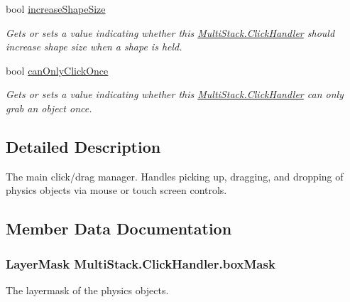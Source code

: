 \begin{DoxyCompactItemize}
bool \hyperlink{class_multi_stack_1_1_click_handler_a7097c4cddc7a31d0a9d303c5367d10be}{increase\+Shape\+Size}
\begin{DoxyCompactList}\small\item\em Gets or sets a value indicating whether this \hyperlink{class_multi_stack_1_1_click_handler}{Multi\+Stack.\+Click\+Handler} should increase shape size when a shape is held. \end{DoxyCompactList}\item 
bool \hyperlink{class_multi_stack_1_1_click_handler_ab7cdf9c5b65265b0f17437ee6313fbeb}{can\+Only\+Click\+Once}
\begin{DoxyCompactList}\small\item\em Gets or sets a value indicating whether this \hyperlink{class_multi_stack_1_1_click_handler}{Multi\+Stack.\+Click\+Handler} can only grab an object once. \end{DoxyCompactList}\end{DoxyCompactItemize}


\subsection{Detailed Description}
The main click/drag manager. Handles picking up, dragging, and dropping of physics objects via mouse or touch screen controls. 



\subsection{Member Data Documentation}
\hypertarget{class_multi_stack_1_1_click_handler_a89cab89c49c38f4b96855de249618405}{}
\subsubsection[{box\+Mask}]{\setlength{\rightskip}{0pt plus 5cm}Layer\+Mask Multi\+Stack.\+Click\+Handler.\+box\+Mask}\label{class_multi_stack_1_1_click_handler_a89cab89c49c38f4b96855de249618405}


The layermask of the physics objects. 

